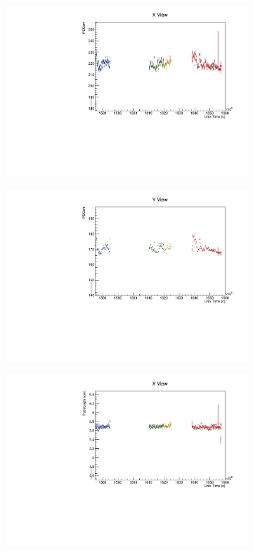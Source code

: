 \documentclass[12pt,a4paper]{article}
\begin{document}
\begin{figure}[h!]
\begin{subfigure}{0.5\textwidth}
  \end{subfigure}
  \begin{subfigure}{0.5\textwidth}
    \includegraphics[width=\linewidth]{driftsec_tb/pecorr_time_x.pdf}
  \end{subfigure}
  \begin{subfigure}{0.5\textwidth}
    \includegraphics[width=\linewidth]{driftsec_tb/pecorr_time_y.pdf}
  \end{subfigure}
  \begin{subfigure}{0.5\textwidth}
    \includegraphics[width=\linewidth]{driftsec_tb/cm_time_x.pdf}

\end{subfigure}
\end{figure}
\end{document}
